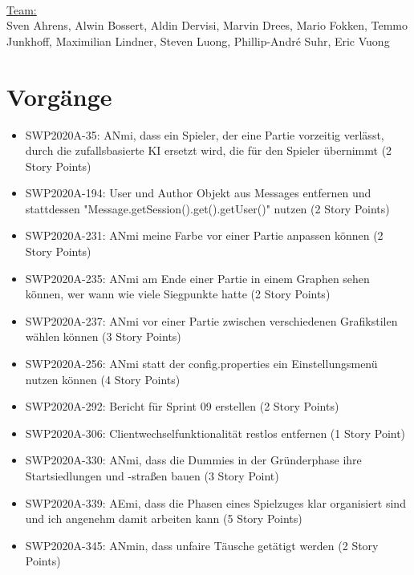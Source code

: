 \documentclass[12pt,a4paper, oneside]{article}
\begin{document}
\noindent
\\
\underline {Team:}
\\
Sven Ahrens, Alwin Bossert, Aldin Dervisi, Marvin Drees, Mario Fokken, Temmo Junkhoff, Maximilian Lindner, Steven Luong, Phillip-André Suhr, Eric Vuong


\section{Vorgänge}

\begin{itemize}

\item SWP2020A-35: ANmi, dass ein Spieler, der eine Partie vorzeitig verlässt, durch die zufallsbasierte KI ersetzt wird, die für den Spieler übernimmt (2 Story Points)

\item SWP2020A-194: User und Author Objekt aus Messages entfernen und stattdessen "Message.getSession().get().getUser()" nutzen (2 Story Points)

\item SWP2020A-231:	ANmi meine Farbe vor einer Partie anpassen können (2 Story Points)

\item SWP2020A-235: ANmi am Ende einer Partie in einem Graphen sehen können, wer wann wie viele Siegpunkte hatte (2 Story Points)

\item SWP2020A-237: ANmi vor einer Partie zwischen verschiedenen Grafikstilen wählen können (3 Story Points)

\item SWP2020A-256: ANmi statt der config.properties ein Einstellungsmenü nutzen können (4 Story Points)

\item SWP2020A-292: Bericht für Sprint 09 erstellen (2 Story Points)

\item SWP2020A-306:	Clientwechselfunktionalität restlos entfernen (1 Story Point)

\item SWP2020A-330:	ANmi, dass die Dummies in der Gründerphase ihre Startsiedlungen und -straßen bauen (3 Story Point)

\item SWP2020A-339: AEmi, dass die Phasen eines Spielzuges klar organisiert sind und ich angenehm damit arbeiten kann (5 Story Points)

\item SWP2020A-345: ANmin, dass unfaire Täusche getätigt werden (2 Story Points)


\end{itemize}
\end{document}
